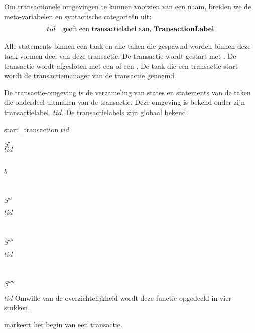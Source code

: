 Om transactionele omgevingen te kunnen voorzien van een naam, breiden we de meta-variabelen en syntactische
categorie\"en uit:
\begin{equation*}
\begin{array}{rl}
  	tid & \textrm{geeft een \Index{transactielabel} aan, \syncat{TransactionLabel}} \\
\end{array}
\end{equation*}
\newpage
{}

Alle statements binnen een taak en alle taken die gespawnd worden binnen deze taak
vormen deel van deze transactie. De transactie wordt gestart met . De transactie wordt afgesloten
met een  of een . De taak die een transactie start wordt de
transactiemanager van de transactie genoemd.

De transactie-omgeving is de verzameling van states en statements van de taken die onderdeel uitmaken van de transactie. Deze
omgeving is bekend onder zijn transactielabel, \(tid\). De transactielabels zijn globaal bekend.

\begin{functie}{start_transaction $tid$} \\
\strut\qquad $S'$ \\
  $tid$ \\
 \\
\strut\qquad {} $b$ \\
\strut\qquad {} \\
\strut\qquad\qquad $S''$ \\
\strut\qquad\qquad{} $tid$ \\
\strut\qquad {} \\
\strut\qquad\qquad $S'''$ \\
\strut\qquad\qquad{} $tid$ \\
\strut{} \\
\strut\qquad $S''''$ \\
\strut\qquad{} $tid$
\functieomschrijving Omwille van de
overzichtelijkheid wordt deze functie opgedeeld in vier stukken.
\end{functie}

 markeert het begin van een transactie.

